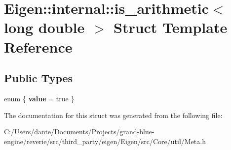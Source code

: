 \hypertarget{struct_eigen_1_1internal_1_1is__arithmetic_3_01long_01double_01_4}{}\section{Eigen\+::internal\+::is\+\_\+arithmetic$<$ long double $>$ Struct Template Reference}
\label{struct_eigen_1_1internal_1_1is__arithmetic_3_01long_01double_01_4}
\subsection*{Public Types}
\begin{DoxyCompactItemize}
\item 
\mbox{\label{struct_eigen_1_1internal_1_1is__arithmetic_3_01long_01double_01_4_af2ce09f097535f3ca5ea6c4d7189a76b}} 
enum \{ {\bfseries value} = true
 \}
\end{DoxyCompactItemize}


The documentation for this struct was generated from the following file\+:\begin{DoxyCompactItemize}
\item 
C\+:/\+Users/dante/\+Documents/\+Projects/grand-\/blue-\/engine/reverie/src/third\+\_\+party/eigen/\+Eigen/src/\+Core/util/Meta.\+h\end{DoxyCompactItemize}
